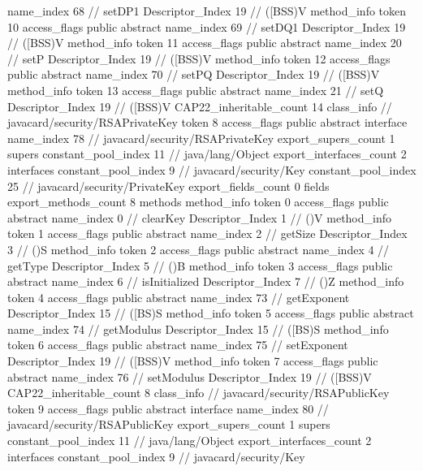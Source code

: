 {{{{{					name_index	68		// setDP1
					Descriptor_Index	19		// ([BSS)V
				}
				method_info {
					token	10
					access_flags	public abstract
					name_index	69		// setDQ1
					Descriptor_Index	19		// ([BSS)V
				}
				method_info {
					token	11
					access_flags	public abstract
					name_index	20		// setP
					Descriptor_Index	19		// ([BSS)V
				}
				method_info {
					token	12
					access_flags	public abstract
					name_index	70		// setPQ
					Descriptor_Index	19		// ([BSS)V
				}
				method_info {
					token	13
					access_flags	public abstract
					name_index	21		// setQ
					Descriptor_Index	19		// ([BSS)V
				}
			}
			CAP22_inheritable_count	14
		}
		class_info {		// javacard/security/RSAPrivateKey
			token	8
			access_flags	public abstract interface
			name_index	78		// javacard/security/RSAPrivateKey
			export_supers_count	1
			supers {
				constant_pool_index	11		// java/lang/Object
			}
			export_interfaces_count	2
			interfaces {
				constant_pool_index	9		// javacard/security/Key
				constant_pool_index	25		// javacard/security/PrivateKey
			}
			export_fields_count	0
			fields {
			}
			export_methods_count	8
			methods {
				method_info {
					token	0
					access_flags	public abstract
					name_index	0		// clearKey
					Descriptor_Index	1		// ()V
				}
				method_info {
					token	1
					access_flags	public abstract
					name_index	2		// getSize
					Descriptor_Index	3		// ()S
				}
				method_info {
					token	2
					access_flags	public abstract
					name_index	4		// getType
					Descriptor_Index	5		// ()B
				}
				method_info {
					token	3
					access_flags	public abstract
					name_index	6		// isInitialized
					Descriptor_Index	7		// ()Z
				}
				method_info {
					token	4
					access_flags	public abstract
					name_index	73		// getExponent
					Descriptor_Index	15		// ([BS)S
				}
				method_info {
					token	5
					access_flags	public abstract
					name_index	74		// getModulus
					Descriptor_Index	15		// ([BS)S
				}
				method_info {
					token	6
					access_flags	public abstract
					name_index	75		// setExponent
					Descriptor_Index	19		// ([BSS)V
				}
				method_info {
					token	7
					access_flags	public abstract
					name_index	76		// setModulus
					Descriptor_Index	19		// ([BSS)V
				}
			}
			CAP22_inheritable_count	8
		}
		class_info {		// javacard/security/RSAPublicKey
			token	9
			access_flags	public abstract interface
			name_index	80		// javacard/security/RSAPublicKey
			export_supers_count	1
			supers {
				constant_pool_index	11		// java/lang/Object
			}
			export_interfaces_count	2
			interfaces {
				constant_pool_index	9		// javacard/security/Key
}}}}

